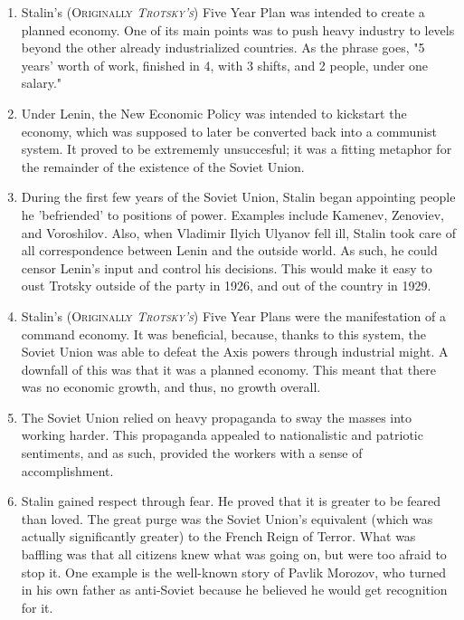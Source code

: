 \documentclass[12pt]{article}
\begin{document}
\begin{flushleft}
\begin{enumerate}
\item Stalin's (\textsc{Originally \textit{Trotsky's}}) Five Year Plan was intended to create a planned economy. One of its main points was to push heavy industry to levels beyond the other already industrialized countries. As the phrase goes, "5 years' worth of work, finished in 4, with 3 shifts, and 2 people, under one salary."   

\item Under Lenin, the New Economic Policy was intended to kickstart the economy, which was supposed to later be converted back into a communist system. It proved to be extrememly unsuccesful; it was a fitting metaphor for the remainder of the existence of the Soviet Union. 

\item During the first few years of the Soviet Union, Stalin began appointing people he 'befriended' to positions of power. Examples include Kamenev, Zenoviev, and Voroshilov. Also, when Vladimir Ilyich Ulyanov fell ill, Stalin took care of all correspondence between Lenin and the outside world. As such, he could censor Lenin's input and control his decisions. This would make it easy to oust Trotsky outside of the party in 1926, and out of the country in 1929.

\item Stalin's (\textsc{Originally \textit{Trotsky's}}) Five Year Plans were the manifestation of a command economy. It was beneficial, because, thanks to this system, the Soviet Union was able to defeat the Axis powers through industrial might. A downfall of this was that it was a planned economy. This meant that there was no economic growth, and thus, no growth overall.

\item The Soviet Union relied on heavy propaganda to sway the masses into working harder. This propaganda appealed to nationalistic and patriotic sentiments, and as such, provided the workers with a sense of accomplishment.

\item Stalin gained respect through fear. He proved that it is greater to be feared than loved. The great purge was the Soviet Union's equivalent (which was actually significantly greater) to the French Reign of Terror. What was baffling was that all citizens knew what was going on, but were too afraid to stop it. One example is the well-known story of Pavlik Morozov, who turned in his own father as anti-Soviet because he believed he would get recognition for it. 


\end{enumerate}
\end{flushleft}
\end{document}
